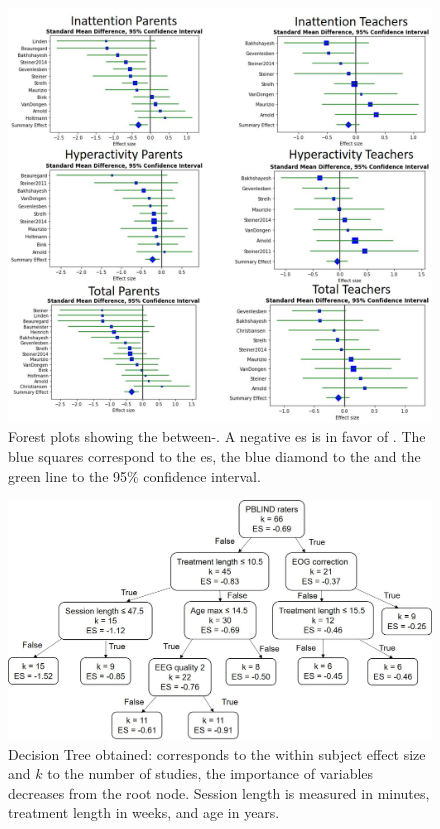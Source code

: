 \begin{figure}[h!]
  \centering
  \includegraphics[width=1.0\linewidth]{figures/meta_review_forest_plots_update_meta_analysis_our_choices_no_colors_2-columns_fitting_image.jpg}
  \caption{Forest plots showing the between-. A negative \gls{es} is in favor of . 
	The blue squares correspond to the \gls{es}, the blue diamond to the  and the green line to the 95\% confidence interval.}
  \label{Figure:meta_review_forest_plots_update_meta_analysis_our_choices_no_colors_2-columns_fitting_image}
\end{figure}

\begin{figure}[h!]
  \centering
  \includegraphics[width=1.0\linewidth]{figures/factors_analysis_decision_tree_results_no_colors_2-columns_fitting_image.jpg}
  \caption{Decision Tree obtained:  corresponds to the within subject effect size and $k$ to the number of studies, 
  the importance of variables decreases from the root node. Session length is measured in minutes, treatment length in weeks, and age in years.}
  \label{Figure:factors_analysis_decision_tree_results}
\end{figure}

